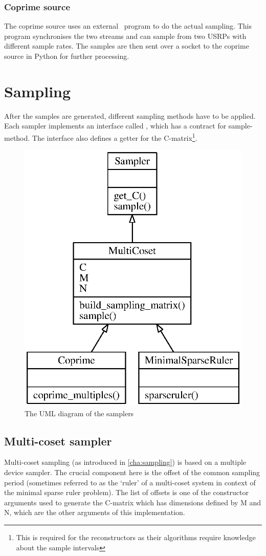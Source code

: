 \documentclass[a4paper, openany, oneside]{memoir}
\begin{document}
\subsubsection{Coprime source}
The coprime source uses an external \CC~program to do the actual sampling. This program synchronises the two streams and can sample from two USRPs with different sample rates. The samples are then sent over a socket to the coprime source in Python for further processing.


\section{Sampling}
\label{sec:sampling}
After the samples are generated, different sampling methods have to be applied. Each sampler implements an interface called , which has a contract for sample-method. The interface also defines a getter for the C-matrix\footnote{This is required for the reconstructors as their algorithms require knowledge about the sample intervals}.

\begin{figure}
    \centering
    \includegraphics[width=0.5\linewidth]{./figures/classes_sampling.eps}
    \caption{The UML diagram of the samplers}
    \label{fig:umlclasses}
\end{figure}

\subsection{Multi-coset sampler}
\label{sub:multi_coset_sampler}
Multi-coset sampling (as introduced in \cref{cha:sampling}) is based on a multiple device sampler. The crucial component here is the offset of the common sampling period (sometimes referred to as the `ruler' of a multi-coset system in context of the minimal sparse ruler problem). The list of offsets is one of the constructor arguments used to generate the C-matrix which has dimensions defined by M and N, which are the other arguments of this implementation.
\end{document}
